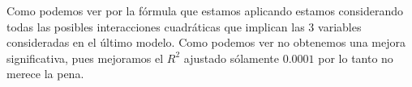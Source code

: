 \documentclass[12pt,a4paper]{article}
\begin{document}
Como podemos ver por la fórmula que estamos aplicando estamos considerando todas las posibles interacciones cuadráticas que implican las 3 variables consideradas en el último modelo. Como podemos ver no obtenemos una mejora significativa, pues mejoramos el $R^2$ ajustado sólamente $0.0001$ por lo tanto no merece la pena.
\end{document}
